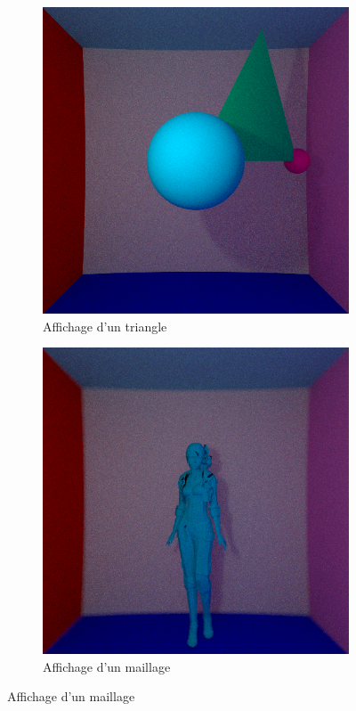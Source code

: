 \documentclass[12pt,a4paper,twoside]{report}
\begin{document}
\begin{figure}[H]
	\centering
	\begin{subfigure}{.45\textwidth}
		\centering
		\includegraphics[width=1.\linewidth]{be5_01_100R}
		\caption{Affichage d'un triangle}
		\label{fig:be5_01_100R}
	\end{subfigure}
	\begin{subfigure}{.45\textwidth}
		\centering
		\includegraphics[width=1.\linewidth]{be6_01_100R_5O_75s}
		\caption{Affichage d'un maillage}
		\label{fig:be6_01_100R_5O}
	\end{subfigure}
\end{figure}
\end{document}

